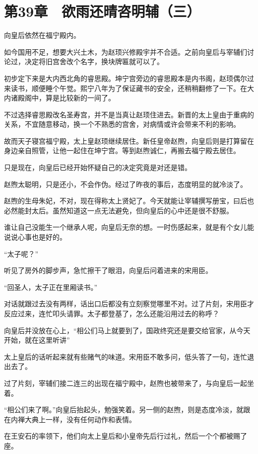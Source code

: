 \section{第39章　欲雨还晴咨明辅（三）}

向皇后依然在福宁殿内。

如今国用不足，想要大兴土木，为赵顼兴修殿宇并不合适。之前向皇后与宰辅们讨论过，决定将旧宫舍改个名字，换块牌匾就可以了。

初步定下来是大内西北角的睿思殿。坤宁宫旁边的睿思殿本是内书阁，赵顼偶尔过来读书，顺便睡个午觉。熙宁八年为了保证藏书的安全，还稍稍翻修了一下。在大内诸殿阁中，算是比较新的一间了。

不过选择睿思殿改名圣寿宫，并不是当真让赵顼住进去。新晋的太上皇由于重病的关系，不宜随意移动，换一个不熟悉的宫舍，对病情或许会带来不利的影响。

故而天子寝宫福宁殿，太上皇赵顼继续居住。新任皇帝赵煦，向皇后则是打算留在身边亲自照管，让他一起住在坤宁宫。等到赵煦诚仁，再搬去福宁殿去居住。

只是现在，向皇后已经开始怀疑自己的决定究竟是对还是错。

赵煦太聪明，只是还小，不会作伪。经过了昨夜的事后，态度明显的就冷淡了。

赵煦的生母朱妃，不对，现在得称太上贤妃了。今天就能让宰辅撰写册宝，曰后也必然能封太后。虽然知道这一点无法避免，但向皇后的心中还是很不舒服。

谁让自己没能生一个继承人呢，向皇后无奈的想。一时伤感起来，就是有个女儿能说说心事也是好的。

“太子呢？”

听见了房外的脚步声，急忙擦干了眼泪，向皇后问着进来的宋用臣。

“回圣人，太子正在里厢读书。”

对话就跟过去没有两样，话出口后都没有立刻察觉哪里不对。过了片刻，宋用臣才反应过来，连忙叩头请罪。太子都登基了，怎么还能沿用过去的称呼？

向皇后并没放在心上，“相公们马上就要到了，国政终究还是要交给官家，从今天开始，就在这里听讲”

太上皇后的话听起来就有些赌气的味道。宋用臣不敢多问，低头答了一句，连忙退出去了。

过了片刻，宰辅们接二连三的出现在福宁殿中，赵煦也被带来了，与向皇后一起坐着。

“相公们来了啊。”向皇后抬起头，勉强笑着。另一侧的赵煦，则是态度冷淡，就跟在内禅大典上一样，没有任何动作和表情。

在王安石的率领下，他们向太上皇后和小皇帝先后行过礼，然后一个个都被赐了座。

